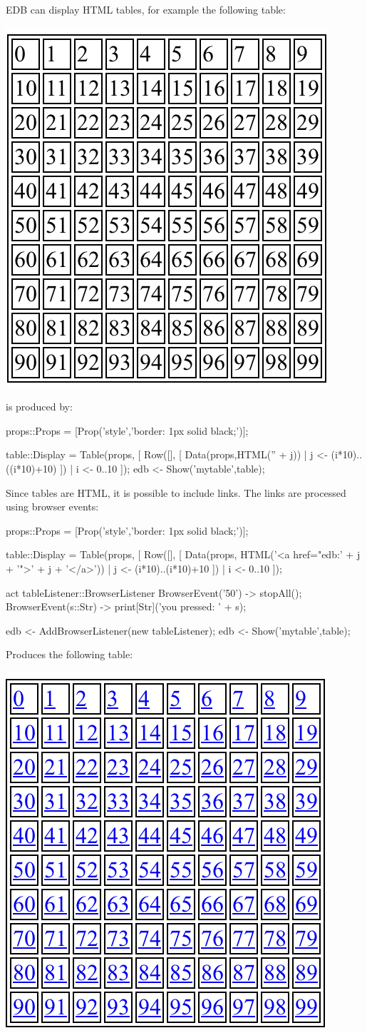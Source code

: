 \documentclass[5p,times]{elsarticle}
\begin{document}
EDB can display HTML tables, for example the following table:
\begin{center}
\includegraphics[width=0.6\columnwidth]{table}
\end{center}
is produced by:
\begin{ESL}
props::Props = [Prop('style','border: 1px solid black;')];

table::Display = 
  Table(props,
    [ Row([],
       [ Data(props,HTML('' + j)) 
       | j <- (i*10)..((i*10)+10) 
       ]) 
    | i <- 0..10 
    ]);
edb <- Show('mytable',table);
\end{ESL}
Since tables are HTML, it is possible to include links. The links are processed using browser events:
\begin{ESL}
props::Props = [Prop('style','border: 1px solid black;')];

table::Display = 
  Table(props,
    [ Row([],
       [ Data(props,
           HTML('<a href="edb:' + j + '">' + j + '</a>')) 
       | j <- (i*10)..(i*10)+10 
       ]) 
    | i <- 0..10
    ]);
  
act tableListener::BrowserListener {
  BrowserEvent('50') -> stopAll();
  BrowserEvent(s::Str) -> print[Str]('you pressed: ' + s);
}

edb <- AddBrowserListener(new tableListener);
edb <- Show('mytable',table);
\end{ESL}
Produces the following table:
\begin{center}
\includegraphics[width=0.6\columnwidth]{links}
\end{center}
\end{document}
